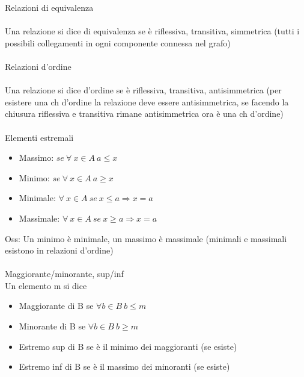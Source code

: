 \documentclass{article}
\begin{document}
\begin{multicols*}{3}
		
		{\Large Relazioni di equivalenza}\\\\
		Una relazione si dice di equivalenza se è riflessiva, transitiva, simmetrica (tutti i possibili collegamenti in ogni componente connessa nel grafo)\\\\
	
		{\Large Relazioni d'ordine}\\\\
		Una relazione si dice d'ordine se è riflessiva, transitiva, antisimmetrica (per esistere una ch d'ordine la relazione deve essere antisimmetrica, se facendo la chiusura riflessiva e transitiva rimane antisimmetrica ora è una ch d'ordine)\\\\
		
		{\Large Elementi estremali}
		\begin{itemize}
			\setlength\itemsep{0.1mm}
			\item Massimo: \(se \ \forall \ x \in A \ a\leq x\)
			\item Minimo: \(se \ \forall \ x \in A \ a\geq x\)
			\item Minimale: \(\forall \ x \in A \ se\ x \leq a \Rightarrow x=a\)
			\item Massimale: \(\forall \ x \in A \ se\ x \geq a \Rightarrow x=a\)
		\end{itemize}
	 
	 	Oss: Un minimo è minimale, un massimo è massimale (minimali e massimali esistono in relazioni d'ordine)\\\\
	 	{\large Maggiorante/minorante, sup/inf}\\
	 	Un elemento m si dice
	 	\begin{itemize}
	 		\setlength\itemsep{0.1mm}
	 		\item Maggiorante di B se \(\forall b \in B \  b \leq m\)
	 		\item Minorante di B se \(\forall b \in B \  b \geq m\)
	 		\item Estremo sup di B se è il minimo dei maggioranti (se esiste)
	 		\item Estremo inf di B se è il massimo dei minoranti (se esiste)
 		\end{itemize}
 		

\end{multicols*}
\end{document}

